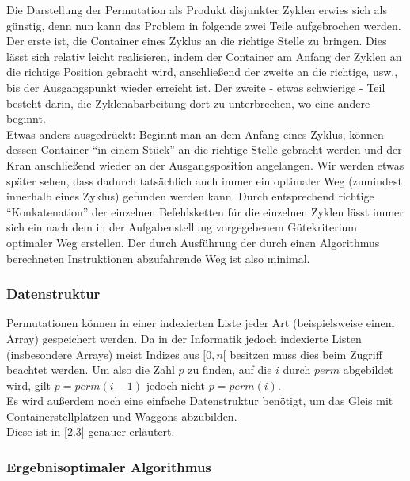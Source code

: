 Die Darstellung der Permutation als Produkt disjunkter Zyklen erwies sich als günstig,
denn nun kann das Problem in folgende zwei Teile aufgebrochen werden.
Der erste ist, die Container eines Zyklus an die richtige Stelle zu bringen.
Dies lässt sich relativ leicht realisieren, indem der Container am Anfang der Zyklen an die richtige Position gebracht wird,
anschließend der zweite an die richtige, usw., bis der Ausgangspunkt wieder erreicht ist.
Der zweite - etwas schwierige - Teil besteht darin, die Zyklenabarbeitung dort zu unterbrechen, wo eine andere beginnt. \\
Etwas anders ausgedrückt:
Beginnt man an dem Anfang eines Zyklus, können dessen Container ``in einem Stück'' an die richtige Stelle gebracht werden und der Kran anschließend wieder an der Ausgangsposition angelangen.
Wir werden etwas später sehen, dass dadurch tatsächlich auch immer ein optimaler Weg (zumindest innerhalb eines Zyklus) gefunden werden kann.
Durch entsprechend richtige ``Konkatenation'' der einzelnen Befehlsketten für die einzelnen Zyklen lässt immer sich ein nach dem in der Aufgabenstellung vorgegebenem Gütekriterium optimaler Weg erstellen.
Der durch Ausführung der durch einen Algorithmus berechneten Instruktionen abzufahrende Weg ist also minimal.
\subsubsection{Datenstruktur}
Permutationen können in einer indexierten Liste jeder Art (beispielsweise einem Array) gespeichert werden.
Da in der Informatik jedoch indexierte Listen (insbesondere Arrays) meist Indizes aus $[0,n[$ besitzen muss dies beim Zugriff beachtet werden.
Um also die Zahl $p$ zu finden, auf die $i$ durch $perm$ abgebildet wird, gilt $p = perm(i-1)$ jedoch nicht $p = perm(i)$. \\
Es wird außerdem noch eine einfache Datenstruktur benötigt, um das Gleis mit Containerstellplätzen und Waggons abzubilden. \\
Diese ist in \ref{2.3} genauer erläutert.
\subsubsection{Ergebnisoptimaler Algorithmus}

